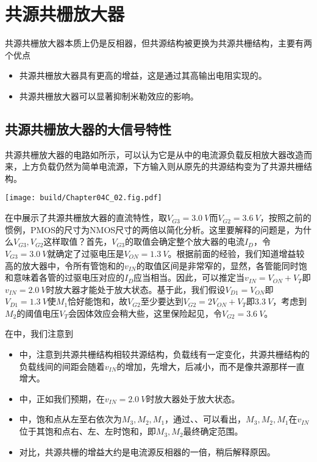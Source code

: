 \section{共源共栅放大器}
共源共栅放大器本质上仍是反相器，但共源结构被更换为共源共栅结构，主要有两个优点
\begin{itemize}
    \item 共源共栅放大器具有更高的增益，这是通过其高输出电阻实现的。
    \item 共源共栅放大器可以显著抑制米勒效应的影响。
\end{itemize}

\subsection{共源共栅放大器的大信号特性}
共源共栅放大器的电路如所示，可以认为它是从中的电流源负载反相放大器改造而来，上方负载仍然为简单电流源，下方输入则从原先的共源结构变为了共源共栅结构。

\begin{Figure}[共源共栅放大器]
    \texttt{[image: build/Chapter04C\_02.fig.pdf]}
\end{Figure}

在中展示了共源共栅放大器的直流特性，取$V_{G3}=\SI{3.0}{V}$而$V_{G2}=\SI{3.6}{V}$，按照之前的惯例，PMOS的尺寸为NMOS尺寸的两倍以简化分析。这里要解释的问题是，为什么$V_{G3},V_{G2}$这样取值？首先，$V_{G3}$的取值会确定整个放大器的电流$I_D$，令$V_{G3}=\SI{3.0}{V}$就确定了过驱电压是$V_{ON}=\SI{1.3}{V}$。根据前面的经验，我们知道增益较高的放大器中，令所有管饱和的$v_{IN}$的取值区间是非常窄的，显然，各管能同时饱和意味着各管的过驱电压对应的$I_D$应当相当。因此，可以推定当$v_{IN}=V_{ON}+V_T$即$v_{IN}=\SI{2.0}{V}$时放大器才能处于放大状态。基于此，我们假设$V_{D1}=V_{ON}$即$V_{D1}=\SI{1.3}{V}$使$M_1$恰好能饱和，故$V_{G2}$至少要达到$V_{G2}=2V_{ON}+V_T$即$\SI{3.3}{V}$，考虑到$M_2$的阈值电压$V_T$会因体效应会稍大些，这里保险起见，令$V_{G2}=\SI{3.6}{V}$。

在中，我们注意到
\begin{itemize}
    \item {}中，注意到共源共栅结构相较共源结构，负载线有一定变化，共源共栅结构的负载线间的间距会随着$v_{IN}$的增加，先增大，后减小，而不是像共源那样一直增大。
    \item {}中，正如我们预期，在$v_{IN}=\SI{2.0}{V}$时放大器处于放大状态。
    \item {}中，饱和点从左至右依次为$M_3,M_2,M_1$，通过、、可以看出，$M_3,M_2,M_1$在$v_{IN}$位于其饱和点右、左、左时饱和，即$M_3,M_2$最终确定范围。
    \item {}对比，共源共栅的增益大约是电流源反相器的一倍，稍后解释原因。
\end{itemize}

